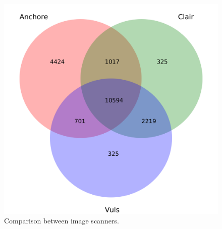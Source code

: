 \documentclass[a4paper,num-refs]{oup-contemporary}
\begin{document}
	\begin{figure}
        \includegraphics[width=\columnwidth]{Figures/venn.pdf}
	\caption{\label{fig:venn} Comparison between image scanners.}
\end{figure}
\end{document}
